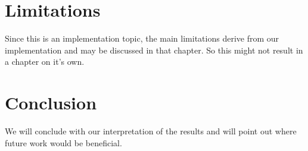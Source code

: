 \documentclass[12pt,twoside]{article}
\theoremstyle{plain}
\theoremstyle{definition}
\theoremstyle{remark}
\begin{document}
\section{Limitations}
\label{sec:limits}

Since this is an implementation topic, the main limitations derive from our implementation and may be discussed in that chapter. So this might not result in a chapter on it's own. %


\section{Conclusion}
\label{sec:concl}

We will conclude with our interpretation of the results and will point out where future work would be beneficial.


%
%
\newpage


\end{document}
